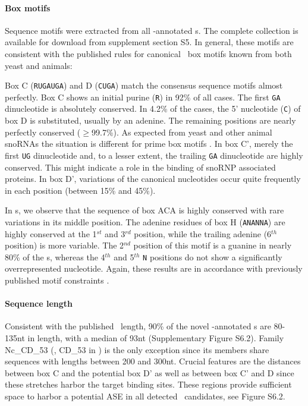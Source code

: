 \paragraph{\textbf{Box motifs}} Sequence motifs were extracted from
all \snostrip-annotated \sno s. The complete collection is available
for download from supplement section S5. In general, these motifs are
consistent with the published rules \cite{Xia:1997, Watkins:2000,
  Cahill:2002, Watkins:2002} for canonical \sno\ box motifs known from
both yeast and animals:

Box C (\texttt{RUGAUGA}) and D (\texttt{CUGA}) match the consensus
sequence motifs almost perfectly. Box C shows an initial purine
(\texttt{R}) in 92\% of all cases.  The first \texttt{GA} dinucleotide
is absolutely conserved.  In 4.2\% of the cases, the 5' nucleotide
(\texttt{C}) of box D is substituted, usually by an adenine. The
remaining positions are nearly perfectly conserved ($\ge$99.7\%). As
expected from yeast and other animal snoRNAs the situation is
different for prime box motifs \cite{
  Cahill:2002,Kiss-László:1998}.  In box C', merely the first
\texttt{UG} dinucleotide and, to a lesser extent, the trailing
\texttt{GA} dinucleotide are highly conserved.  This might indicate a
role in the binding of snoRNP associated proteins.  In box D',
variations of the canonical nucleotides occur quite frequently in each position (between 15\% and 45\%).

In \haca s, we observe that the sequence of box ACA is highly
conserved with rare variations in its middle position. The adenine
residues of box H (\texttt{ANANNA}) are highly conserved at the
1$^{st}$ and 3$^{rd}$ position, while the trailing adenine (6$^{th}$
position) is more variable. The 2$^{nd}$ position of this motif is a
guanine in nearly 80\% of the \haca s, whereas the 4$^{th}$ and
5$^{th}$ \texttt{N} positions do not show a significantly
overrepresented nucleotide. Again, these results are in accordance
with previously published motif constraints \cite{Normand:2006}.

\paragraph{\textbf{Sequence length}} Consistent with the published
\cd\ length, 90\% of the novel \snostrip-annotated \sno s are 80-135nt
in length, with a median of 93nt (Supplementary Figure S6.2).
Family Nc\_CD\_53 (\ncr, CD\_53 in \snostrip) is the only exception
since its members share sequences with lengths between 200 and 300nt.
Crucial features are the distances between box C and the potential box
D' as well as between box C' and D since these stretches harbor the
target binding sites. These regions provide sufficient space to harbor
a potential ASE in all detected \sno\ candidates, see Figure S6.2.

